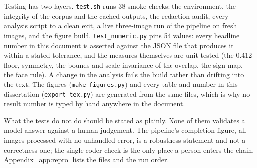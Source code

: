 Testing has two layers. \texttt{test.sh} runs 38 smoke checks: the environment, the integrity of the corpus and the cached outputs, the redaction audit, every analysis script to a clean exit, a live three-image run of the pipeline on fresh images, and the figure build. \texttt{test\_numeric.py} pins 54 values: every headline number in this document is asserted against the JSON file that produces it within a stated tolerance, and the measures themselves are unit-tested (the 0.412 floor, symmetry, the bounds and scale invariance of the overlap, the sign map, the face rule). A change in the analysis fails the build rather than drifting into the text. The figures (\texttt{make\_figures.py}) and every table and number in this dissertation (\texttt{export\_tex.py}) are generated from the same files, which is why no result number is typed by hand anywhere in the document.

What the tests do not do should be stated as plainly. None of them validates a model answer against a human judgement. The pipeline's completion figure, all \nTotal{} images processed with no unhandled error, is a robustness statement and not a correctness one; the single-coder check is the only place a person enters the chain. Appendix~\ref{app:repro} lists the files and the run order.
